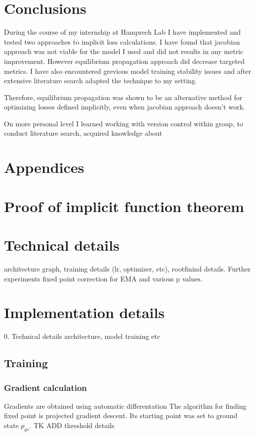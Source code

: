\documentclass[a4paper,10pt]{report}
\begin{document}
\section{Conclusions}
During the course of my internship at Hamprech Lab I have implemented and tested two approaches to implicit loss calculations. I have found that jacobian approach was not viable for the model I used and did not results in any metric improvement.
However equilibrium propagation approach did decrease targeted metrics. I have also encountered grevious model training stability issues and after extensive literature search adapted the technique to my setting.

Therefore, equilibrium propagation was shown to be an alternative method for optimizing losses defined implicitly, even when jacobian approach doesn't work.

On more personal level I learned working with version control within group, to conduct literature search, acquired knowledge about
\nocite{*}




\section{Appendices}



\appendix
\section{Proof of implicit function theorem}

\section{Technical details}
architecture graph, training details (lr, optimizer, etc), rootfinind details.
Further experiments
fixed point correction for EMA and various p values.
\appendix
\section{Implementation details} \label{sec:impl}
0. Technical details
    architecture,
    model
    training
    etc
\subsection{Training}
\subsubsection{Gradient calculation}
Gradients are obtained using automatic differentation
The algorithm for finding fixed point is projected gradient descent. Its starting point was set to ground state $p_{gs}$.
TK ADD threshold details
\end{document}
